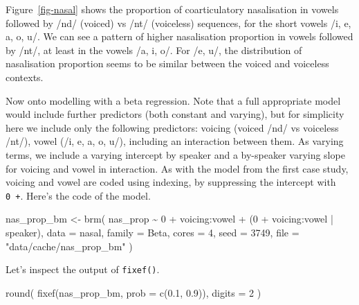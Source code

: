\documentclass[
  authoryear,
  preprint,
  3p]{elsarticle}
\newenvironment{Shaded}{\begin{snugshade}}{\end{snugshade}}
\newcommand{\AttributeTok}[1]{\textcolor[rgb]{0.40,0.45,0.13}{#1}}
\newcommand{\DecValTok}[1]{\textcolor[rgb]{0.68,0.00,0.00}{#1}}
\newcommand{\FloatTok}[1]{\textcolor[rgb]{0.68,0.00,0.00}{#1}}
\newcommand{\FunctionTok}[1]{\textcolor[rgb]{0.28,0.35,0.67}{#1}}
\newcommand{\NormalTok}[1]{\textcolor[rgb]{0.00,0.23,0.31}{#1}}
\newcommand{\OtherTok}[1]{\textcolor[rgb]{0.00,0.23,0.31}{#1}}
\newcommand{\SpecialCharTok}[1]{\textcolor[rgb]{0.37,0.37,0.37}{#1}}
\newcommand{\StringTok}[1]{\textcolor[rgb]{0.13,0.47,0.30}{#1}}
\begin{document}
Figure~\ref{fig-nasal} shows the proportion of coarticulatory
nasalisation in vowels followed by /nd/ (voiced) vs /nt/ (voiceless)
sequences, for the short vowels /i, e, a, o, u/. We can see a pattern of
higher nasalisation proportion in vowels followed by /nt/, at least in
the vowels /a, i, o/. For /e, u/, the distribution of nasalisation
proportion seems to be similar between the voiced and voiceless
contexts.

Now onto modelling with a beta regression. Note that a full appropriate
model would include further predictors (both constant and varying), but
for simplicity here we include only the following predictors: voicing
(voiced /nd/ vs voiceless /nt/), vowel (/i, e, a, o, u/), including an
interaction between them. As varying terms, we include a varying
intercept by speaker and a by-speaker varying slope for voicing and
vowel in interaction. As with the model from the first case study,
voicing and vowel are coded using indexing, by suppressing the intercept
with \texttt{0\ +}. Here's the code of the model.

\begin{Shaded}
\begin{Highlighting}[]
\NormalTok{nas\_prop\_bm }\OtherTok{\textless{}{-}} \FunctionTok{brm}\NormalTok{(}
\NormalTok{  nas\_prop }\SpecialCharTok{\textasciitilde{}} \DecValTok{0} \SpecialCharTok{+}\NormalTok{ voicing}\SpecialCharTok{:}\NormalTok{vowel }\SpecialCharTok{+}\NormalTok{ (}\DecValTok{0} \SpecialCharTok{+}\NormalTok{ voicing}\SpecialCharTok{:}\NormalTok{vowel }\SpecialCharTok{|}\NormalTok{ speaker),}
  \AttributeTok{data =}\NormalTok{ nasal,}
  \AttributeTok{family =}\NormalTok{ Beta,}
  \AttributeTok{cores =} \DecValTok{4}\NormalTok{,}
  \AttributeTok{seed =} \DecValTok{3749}\NormalTok{,}
  \AttributeTok{file =} \StringTok{"data/cache/nas\_prop\_bm"}
\NormalTok{)}
\end{Highlighting}
\end{Shaded}

Let's inspect the output of \texttt{fixef()}.

\begin{Shaded}
\begin{Highlighting}[]
\FunctionTok{round}\NormalTok{(}
  \FunctionTok{fixef}\NormalTok{(nas\_prop\_bm, }\AttributeTok{prob =} \FunctionTok{c}\NormalTok{(}\FloatTok{0.1}\NormalTok{, }\FloatTok{0.9}\NormalTok{)),}
  \AttributeTok{digits =} \DecValTok{2}
\NormalTok{)}
\end{Highlighting}
\end{Shaded}
\end{document}
